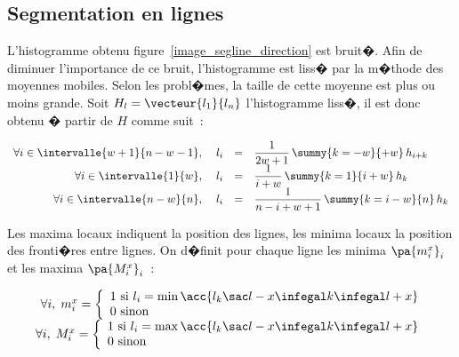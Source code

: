\subsection{Segmentation en lignes}\label{section_segmentation_ligne}


L'histogramme obtenu figure~\ref{image_segline_direction} est bruit�. Afin de diminuer l'importance de ce bruit, l'histogramme est liss� par la m�thode des moyennes mobiles. Selon les probl�mes, la taille de cette moyenne est plus ou moins grande. Soit $H_l = \vecteur{l_1}{l_n}$ l'histogramme liss�, il est donc obtenu � partir de $H$ comme suit~:


            \begin{eqnarray}
            \begin{array}{rrcl}
            \forall i \in \intervalle{w+1}{n-w-1},     \; &     l_i &=& \dfrac{1}{2w+1} \, \summy{k=-w}{+w} \, h_{i+k} \\
            \forall i \in \intervalle{1}{w},                 \; &     l_i &=& \dfrac{1}{i+w} \, \summy{k=1}{i+w} \, h_k \\
            \forall i \in \intervalle{n-w}{n},             \; &     l_i &=& \dfrac{1}{n-i+ w + 1} \, \summy{k=i-w}{n} \, h_k 
            \end{array}
            \label{image_lissage_equation}
            \end{eqnarray}


Les maxima locaux indiquent la position des lignes, les minima locaux la position des fronti�res entre lignes. On d�finit pour chaque ligne les minima $\pa{m_i^x}_i$ et les maxima $\pa{M_i^x}_i$~:


            $$
            \begin{array}{rcl}
            \forall i, \; m_i^x = \left\{ \begin{array}{l}
                                                                        1 \text{ si } l_i = \min \acc { l_k \sac l-x \infegal k \infegal l+x } \\
                                                                        0 \text{ sinon}
                                                                    \end{array} \right. \\
            \forall i, \; M_i^x = \left\{ \begin{array}{l}
                                                                        1 \text{ si } l_i = \max \acc { l_k \sac l-x \infegal k \infegal l+x } \\
                                                                        0 \text{ sinon}
                                                                    \end{array} \right.
            \end{array}
            $$


